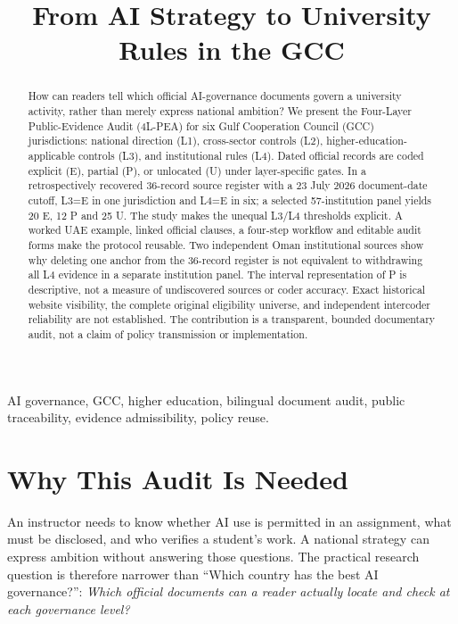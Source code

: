 \documentclass[conference,letterpaper]{IEEEtran}
\begin{document}
\title{From AI Strategy to University Rules in the GCC}
\author{}
\maketitle
\begin{abstract}
How can readers tell which official AI-governance documents govern a university activity, rather than merely express national ambition? We present the Four-Layer Public-Evidence Audit (4L-PEA) for six Gulf Cooperation Council (GCC) jurisdictions: national direction (L1), cross-sector controls (L2), higher-education-applicable controls (L3), and institutional rules (L4). Dated official records are coded explicit (E), partial (P), or unlocated (U) under layer-specific gates. In a retrospectively recovered 36-record source register with a 23 July 2026 document-date cutoff, L3=E in one jurisdiction and L4=E in six; a selected 57-institution panel yields 20 E, 12 P and 25 U. The study makes the unequal L3/L4 thresholds explicit. A worked UAE example, linked official clauses, a four-step workflow and editable audit forms make the protocol reusable. Two independent Oman institutional sources show why deleting one anchor from the 36-record register is not equivalent to withdrawing all L4 evidence in a separate institution panel. The interval representation of P is descriptive, not a measure of undiscovered sources or coder accuracy. Exact historical website visibility, the complete original eligibility universe, and independent intercoder reliability are not established. The contribution is a transparent, bounded documentary audit, not a claim of policy transmission or implementation.
\end{abstract}
\begin{IEEEkeywords}
AI governance, GCC, higher education, bilingual document audit, public traceability, evidence admissibility, policy reuse.
\end{IEEEkeywords}

\section{Why This Audit Is Needed}
An instructor needs to know whether AI use is permitted in an assignment, what must be disclosed, and who verifies a student's work. A national strategy can express ambition without answering those questions. The practical research question is therefore narrower than ``Which country has the best AI governance?'': \emph{Which official documents can a reader actually locate and check at each governance level?}
\end{document}
